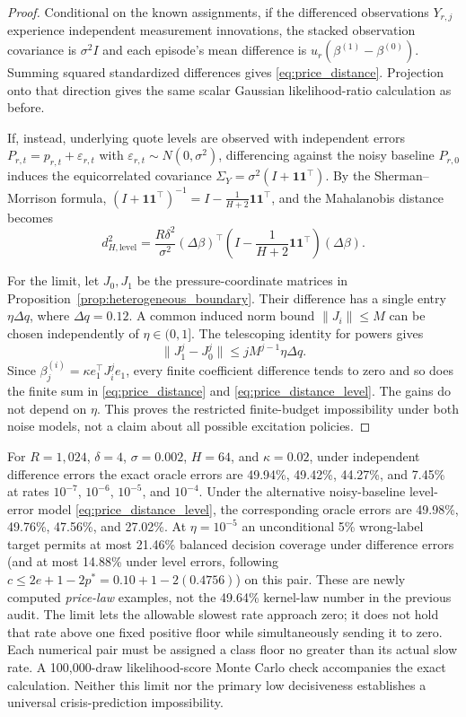 \documentclass[10pt,twocolumn,letterpaper]{article}
\theoremstyle{definition}
\theoremstyle{remark}
\begin{document}
\begin{proof}
Conditional on the known assignments, if the differenced observations $Y_{r,j}$ experience independent measurement innovations, the stacked observation covariance is $\sigma^2I$ and each episode's mean difference is $u_r(\beta^{(1)}-\beta^{(0)})$. Summing squared standardized differences gives \eqref{eq:price_distance}. Projection onto that direction gives the same scalar Gaussian likelihood-ratio calculation as before.

If, instead, underlying quote levels are observed with independent errors $P_{r,t}=p_{r,t}+\varepsilon_{r,t}$ with $\varepsilon_{r,t}\sim N(0,\sigma^2)$, differencing against the noisy baseline $P_{r,0}$ induces the equicorrelated covariance $\Sigma_Y=\sigma^2(I+\mathbf1\mathbf1^\top)$. By the Sherman--Morrison formula, $(I+\mathbf1\mathbf1^\top)^{-1}=I-\frac{1}{H+2}\mathbf1\mathbf1^\top$, and the Mahalanobis distance becomes
\begin{equation}
 d_{H,\mathrm{level}}^2=\frac{R\delta^2}{\sigma^2}(\Delta\beta)^\top\left(I-\frac{1}{H+2}\mathbf1\mathbf1^\top\right)(\Delta\beta).
 \label{eq:price_distance_level}
\end{equation}

For the limit, let $J_0,J_1$ be the pressure-coordinate matrices in Proposition~\ref{prop:heterogeneous_boundary}. Their difference has a single entry $\eta\Delta q$, where $\Delta q=0.12$. A common induced norm bound $\|J_i\|\le M$ can be chosen independently of $\eta\in(0,1]$. The telescoping identity for powers gives
\[
 \|J_1^j-J_0^j\|\le jM^{j-1}\eta\Delta q.
\]
Since $\beta_j^{(i)}=\kappa e_1^\top J_i^je_1$, every finite coefficient difference tends to zero and so does the finite sum in \eqref{eq:price_distance} and \eqref{eq:price_distance_level}. The gains do not depend on $\eta$. This proves the restricted finite-budget impossibility under both noise models, not a claim about all possible excitation policies.
\end{proof}

For $R=1,024$, $\delta=4$, $\sigma=0.002$, $H=64$, and $\kappa=0.02$, under independent difference errors the exact oracle errors are 49.94\%, 49.42\%, 44.27\%, and 7.45\% at rates $10^{-7}$, $10^{-6}$, $10^{-5}$, and $10^{-4}$. Under the alternative noisy-baseline level-error model \eqref{eq:price_distance_level}, the corresponding oracle errors are 49.98\%, 49.76\%, 47.56\%, and 27.02\%. At $\eta=10^{-5}$ an unconditional 5\% wrong-label target permits at most 21.46\% balanced decision coverage under difference errors (and at most 14.88\% under level errors, following $c \le 2e + 1 - 2p^* = 0.10 + 1 - 2(0.4756)$) on this pair. These are newly computed \emph{price-law} examples, not the 49.64\% kernel-law number in the previous audit. The limit lets the allowable slowest rate approach zero; it does not hold that rate above one fixed positive floor while simultaneously sending it to zero. Each numerical pair must be assigned a class floor no greater than its actual slow rate. A 100,000-draw likelihood-score Monte Carlo check accompanies the exact calculation. Neither this limit nor the primary low decisiveness establishes a universal crisis-prediction impossibility.
\end{document}
